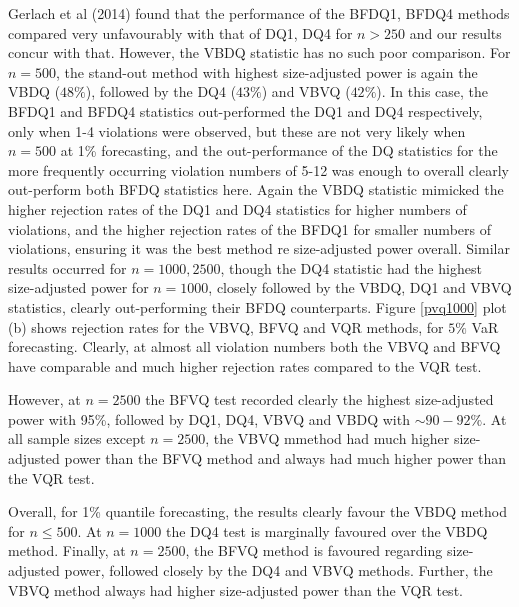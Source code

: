 \documentclass[12pt,epsf]{article}
\begin{document}
Gerlach et al (2014) found that the performance of the BFDQ1, BFDQ4 methods compared very unfavourably with that of
DQ1, DQ4 for $n>250$ and our results concur with that. However, the VBDQ statistic has no such poor comparison.
For $n=500$, the stand-out method with highest size-adjusted power is again the VBDQ ($48\%$), followed by the
DQ4 ($43\%$) and VBVQ ($42\%$). In this case, the BFDQ1 and BFDQ4 statistics out-performed the DQ1 and DQ4 respectively,
only when 1-4 violations were observed, but these are not very likely when $n=500$ at 1\% forecasting, and the
out-performance of the DQ statistics for the more frequently occurring violation numbers of 5-12 was enough to
overall clearly out-perform both BFDQ statistics here. Again the VBDQ statistic mimicked the higher rejection
rates of the DQ1 and DQ4 statistics for higher numbers of violations, and the higher rejection rates of the BFDQ1 for smaller
numbers of violations, ensuring it was the best method re size-adjusted power overall. Similar results occurred for
$n=1000, 2500$, though the DQ4 statistic had the highest size-adjusted power for $n=1000$, closely followed by the
VBDQ, DQ1 and VBVQ statistics, clearly out-performing their BFDQ counterparts. Figure \ref{pvq1000} plot (b) shows
rejection rates for the VBVQ, BFVQ and VQR methods, for $5\%$ VaR forecasting. Clearly, at almost all violation numbers
both the VBVQ and BFVQ have comparable and much higher rejection rates compared to the VQR test.

However, at $n=2500$ the BFVQ test recorded clearly the highest size-adjusted power with 95\%,
followed by DQ1, DQ4, VBVQ and VBDQ with $\sim 90-92\%$. At all sample sizes except $n=2500$, the VBVQ mmethod had much higher
size-adjusted power than the BFVQ method and always had much higher power than the VQR test.

Overall, for 1\% quantile forecasting, the results clearly favour the VBDQ method for $n \le 500$. At $n=1000$ the DQ4 test is marginally
favoured over the VBDQ method. Finally, at $n=2500$, the BFVQ method is favoured regarding size-adjusted power, followed closely by
the DQ4 and VBVQ methods. Further, the VBVQ method always had higher size-adjusted power than the VQR test.

\end{document}
